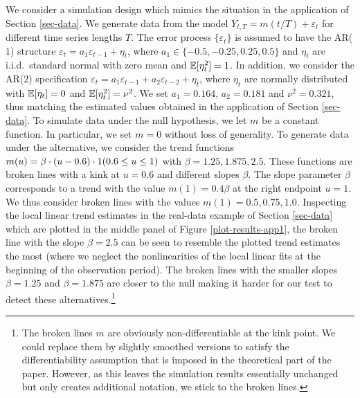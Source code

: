We consider a simulation design which mimics the situation in the application of Section \ref{sec-data}. We generate data from the model $Y_{t,T} = m(t/T) + \varepsilon_t$ for different time series lengths $T$. The error process $\{ \varepsilon_t\}$ is assumed to have the AR($1$) structure $\varepsilon_t = a_1 \varepsilon_{t-1} + \eta_t$, where $a_1 \in \{-0.5,-0.25,0.25,0.5\}$ and $\eta_t$ are i.i.d.\ standard normal with zero mean and $\mathbb{E}[\eta_t^2] = 1$. In addition, we consider the AR($2$) specification $\varepsilon_t = a_1 \varepsilon_{t-1} + a_2 \varepsilon_{t-2} + \eta_t$, where $\eta_t$ are normally distributed with $\mathbb{E}[\eta_t] = 0$ and $\mathbb{E}[\eta_t^2] = \nu^2$. We set $a_1 = 0.164$, $a_2 = 0.181$ and $\nu^2 = 0.321$, thus matching the estimated values obtained in the application of Section \ref{sec-data}. To simulate data under the null hypothesis, we let $m$ be a constant function. In particular, we set $m = 0$ without loss of generality. To generate data under the alternative, we consider the trend functions $m(u) = \beta \cdot (u - 0.6) \cdot 1(0.6 \le u \le 1)$ with $\beta = 1.25, 1.875, 2.5$. These functions are broken lines with a kink at $u = 0.6$ and different slopes $\beta$. The slope parameter $\beta$ corresponds to a trend with the value $m(1) = 0.4 \beta$ at the right endpoint $u = 1$. We thus consider broken lines with the values $m(1) = 0.5, 0.75, 1.0$. Inspecting the local linear trend estimates in the real-data example of Section \ref{sec-data} which are plotted in the middle panel of  Figure \ref{plot-results-app1}, the broken line with the slope $\beta = 2.5$ can be seen to resemble the plotted trend estimates the most (where we neglect the nonlinearities of the local linear fits at the beginning of the observation period). The broken lines with the smaller slopes $\beta = 1.25$ and $\beta = 1.875$ are closer to the null making it harder for our test to detect these alternatives.\footnote{The broken lines $m$ are obviously non-differentiable at the kink point. We could replace them by slightly smoothed versions to satisfy the differentiability assumption that is imposed in the theoretical part of the paper. However, as this leaves the simulation results essentially unchanged but only creates additional notation, we stick to the broken lines.}


